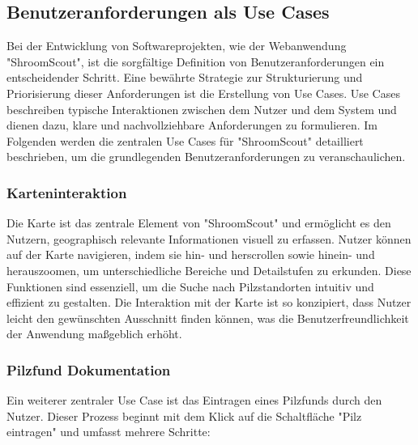 \documentclass[../main.tex]{subfiles}
\begin{document}
\subsection{Benutzeranforderungen als Use Cases} %

Bei der Entwicklung von Softwareprojekten, wie der Webanwendung "ShroomScout", ist die sorgfältige Definition von 
Benutzeranforderungen ein entscheidender Schritt. Eine bewährte Strategie zur Strukturierung und Priorisierung dieser 
Anforderungen ist die Erstellung von Use Cases. Use Cases beschreiben typische Interaktionen zwischen dem Nutzer und 
dem System und dienen dazu, klare und nachvollziehbare Anforderungen zu formulieren. Im Folgenden werden die zentralen 
Use Cases für "ShroomScout" detailliert beschrieben, um die grundlegenden Benutzeranforderungen zu veranschaulichen.

\subsubsection{Karteninteraktion}
Die Karte ist das zentrale Element von "ShroomScout" und ermöglicht es den Nutzern, geographisch relevante Informationen 
visuell zu erfassen. Nutzer können auf der Karte navigieren, indem sie hin- und herscrollen sowie hinein- und herauszoomen, 
um unterschiedliche Bereiche und Detailstufen zu erkunden. Diese Funktionen sind essenziell, um die Suche nach Pilzstandorten 
intuitiv und effizient zu gestalten. Die Interaktion mit der Karte ist so konzipiert, dass Nutzer leicht den gewünschten 
Ausschnitt finden können, was die Benutzerfreundlichkeit der Anwendung maßgeblich erhöht.

\subsubsection{Pilzfund Dokumentation}
Ein weiterer zentraler Use Case ist das Eintragen eines Pilzfunds durch den Nutzer. Dieser Prozess beginnt mit dem Klick 
auf die Schaltfläche "Pilz eintragen" und umfasst mehrere Schritte:
\end{document}

